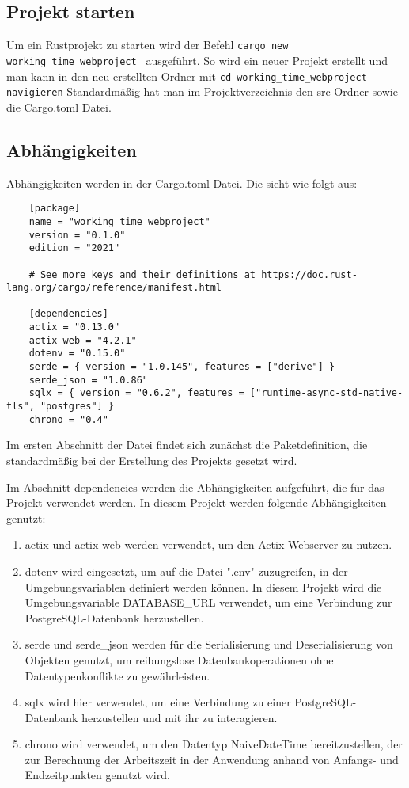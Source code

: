 
\subsection{Projekt starten}
	Um ein Rustprojekt zu starten wird der Befehl \texttt{cargo new working\_time\_webproject } ausgeführt. 
	So wird ein neuer Projekt erstellt und man kann in den neu erstellten Ordner mit \texttt{cd working\_time\_webproject navigieren}
	Standardmäßig hat man im Projektverzeichnis den src Ordner sowie die Cargo.toml Datei. 

\subsection{Abhängigkeiten}
	Abhängigkeiten werden in der Cargo.toml Datei. Die sieht wie folgt aus:
	\begin{verbatim}
	[package]
	name = "working_time_webproject"
	version = "0.1.0"
	edition = "2021"
	
	# See more keys and their definitions at https://doc.rust-lang.org/cargo/reference/manifest.html
	
	[dependencies]
	actix = "0.13.0"
	actix-web = "4.2.1"
	dotenv = "0.15.0"
	serde = { version = "1.0.145", features = ["derive"] }
	serde_json = "1.0.86"
	sqlx = { version = "0.6.2", features = ["runtime-async-std-native-tls", "postgres"] }
	chrono = "0.4"
	\end{verbatim}
	
	Im ersten Abschnitt der Datei findet sich zunächst die Paketdefinition, die standardmäßig bei der Erstellung des Projekts gesetzt wird.

	Im Abschnitt dependencies werden die Abhängigkeiten aufgeführt, die für das Projekt verwendet werden. In diesem Projekt werden folgende Abhängigkeiten genutzt:

	\begin{enumerate}
	\item actix und actix-web werden verwendet, um den Actix-Webserver zu nutzen.
	\item dotenv wird eingesetzt, um auf die Datei ".env" zuzugreifen, in der Umgebungsvariablen definiert werden können. In diesem Projekt wird die Umgebungsvariable DATABASE\_URL verwendet, um eine Verbindung zur PostgreSQL-Datenbank herzustellen.
	\item serde und serde\_json werden für die Serialisierung und Deserialisierung von Objekten genutzt, um reibungslose Datenbankoperationen ohne Datentypenkonflikte zu gewährleisten.
	\item sqlx wird hier verwendet, um eine Verbindung zu einer PostgreSQL-Datenbank herzustellen und mit ihr zu interagieren.
	\item chrono wird verwendet, um den Datentyp NaiveDateTime bereitzustellen, der zur Berechnung der Arbeitszeit in der Anwendung anhand von Anfangs- und Endzeitpunkten genutzt wird.
	\end{enumerate}
	
